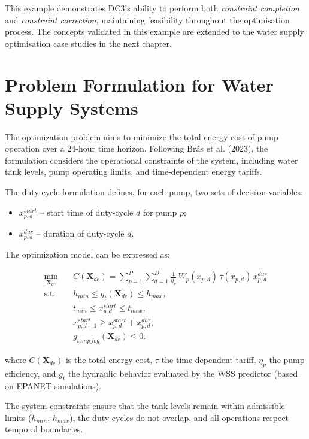 This example demonstrates DC3’s ability to perform both \textit{constraint completion} and \textit{constraint correction}, maintaining feasibility throughout the optimisation process. The concepts validated in this example are extended to the water supply optimisation case studies in the next chapter.


\section{Problem Formulation for Water Supply Systems}

The optimization problem aims to minimize the total energy cost of pump operation over a 24-hour time horizon. Following Brás et al. (2023), the formulation considers the operational constraints of the system, including water tank levels, pump operating limits, and time-dependent energy tariffs.

The duty-cycle formulation defines, for each pump, two sets of decision variables:
\begin{itemize}
    \item $x_{p,d}^{start}$ – start time of duty-cycle $d$ for pump $p$;
    \item $x_{p,d}^{dur}$ – duration of duty-cycle $d$.
\end{itemize}

The optimization model can be expressed as:

\begin{equation}
\begin{aligned}
\min_{\mathbf{X}_{dc}} \quad & C(\mathbf{X}_{dc}) = 
\sum_{p=1}^{P} \sum_{d=1}^{D} \frac{1}{\eta_p} \, W_p(x_{p,d}) \, \tau(x_{p,d}) \, x_{p,d}^{dur} \\
\text{s.t.} \quad & h_{min} \leq g_t(\mathbf{X}_{dc}) \leq h_{max}, \\
& t_{min} \leq x_{p,d}^{start} \leq t_{max}, \\
& x_{p,d+1}^{start} \geq x_{p,d}^{start} + x_{p,d}^{dur}, \\
& g_{temp\_log}(\mathbf{X}_{dc}) \leq 0.
\end{aligned}
\end{equation}

where $C(\mathbf{X}_{dc})$ is the total energy cost, $\tau$ the time-dependent tariff, $\eta_p$ the pump efficiency, and $g_t$ the hydraulic behavior evaluated by the WSS predictor (based on EPANET simulations). 

The system constraints ensure that the tank levels remain within admissible limits ($h_{min}$, $h_{max}$), the duty cycles do not overlap, and all operations respect temporal boundaries.

